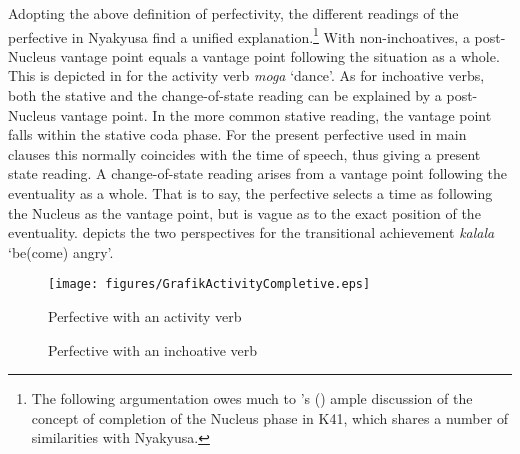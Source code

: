 Adopting the above definition of perfectivity, the different readings of the perfective in Nyakyusa find a unified explanation.\footnote{The following argumentation owes much to \citeauthor{CraneTM2011}'s (\citeyear{CraneTM2011}) ample discussion of the concept of completion of the Nucleus phase in  K41, which shares a number of similarities with Nyakyusa.} With non-inchoatives, a post-Nucleus vantage point equals a vantage point following the situation as a whole. This is depicted in  for the activity verb \textit{moga} \lq dance'. As for inchoative verbs, both the stative and the change-of-state reading can be explained by a post-Nucleus vantage point. In the more common stative reading, the vantage point falls within the stative coda phase. For the present perfective used in main clauses this normally coincides with the time of speech, thus giving a present state reading. A change-of-state reading arises from a vantage point following the eventuality as a whole. That is to say, the perfective selects a time as following the Nucleus as the vantage point, but is vague as to the exact position of the eventuality.  depicts the two perspectives for the transitional achievement \textit{kalala} \lq be(come) angry'.

\begin{figure} 
\begin{center}
\texttt{[image: figures/GrafikActivityCompletive.eps]}
\caption{Perfective with an activity verb}
\label{FigurePerfectiveActivity}
\end{center}
\end{figure}

\begin{figure} 
\begin{center}
\caption{\label{FigurePerfectiveInchoative}Perfective with an inchoative verb}
\end{center}
\end{figure}

 \newpage 
